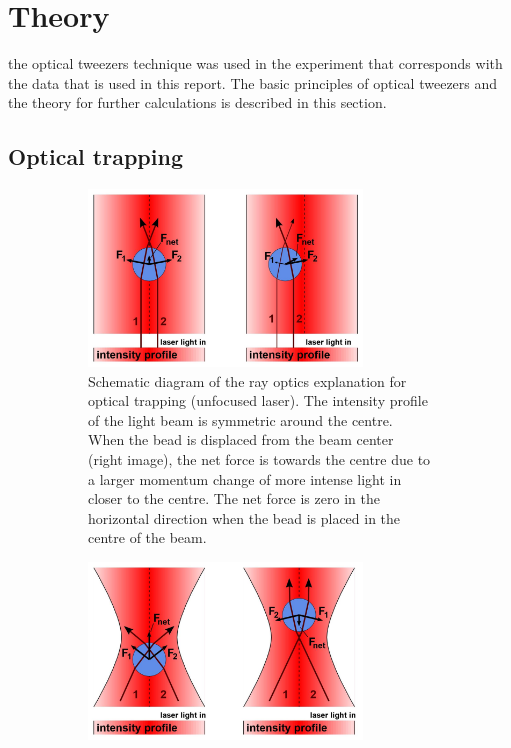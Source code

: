 \section{Theory}

 the optical tweezers technique was used in the experiment that corresponds with the data that is used in this report. The basic principles of optical tweezers and the theory for further calculations is described in this section. \
\

\subsection{Optical trapping}

\begin{figure}
    \centering
    \begin{subfigure}{0.35\textwidth}
    	\centering
    	\includegraphics[width=0.8\textwidth,keepaspectratio]{figures/Optical_trap_unfocused.jpg}
    	\caption{ Schematic diagram of the ray optics explanation for optical trapping (unfocused laser). The intensity profile of the light beam is symmetric around the centre. When the bead is displaced from the beam center (right image), the net force is towards the centre due to a larger momentum change of more intense light in closer to the centre. The net force is zero in the horizontal direction when the bead is placed in the centre of the beam. }
    	\label{fig_optic_trap_1}
	\end{subfigure}
	\begin{subfigure}{0.35\textwidth}
		\centering
    	\includegraphics[width=0.8\textwidth,keepaspectratio]{figures/Optical_trap_focused.jpg}

\end{subfigure}
\end{figure}
